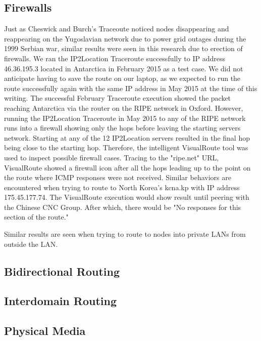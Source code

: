 \documentclass{sigcomm-alternate}
\begin{document}
\subsection{Firewalls}
Just as Cheswick and Burch's Traceoute \cite{ches} noticed nodes disappearing and reappearing on the Yugoslavian network due to power grid outages during the 1999 Serbian war, similar results were seen in this research due to erection of firewalls. We ran the IP2Location Traceroute successfully to IP address 46.36.195.3 located in Antarctica in February 2015 as a test case. We did not anticipate having to save the route on our laptop, as we expected to run the route successfully again with the same IP address in May 2015 at the time of this writing. The successful February Traceroute execution showed the packet reaching Antarctica via the router on the RIPE network in Oxford. However, running the IP2Location Traceroute in May 2015 to any of the RIPE network runs into a firewall showing only the hops before leaving the starting servers network. Starting at any of the 12 IP2Location servers resulted in the final hop being close to the starting hop. Therefore, the intelligent VisualRoute tool was used to inspect possible firewall cases. Tracing to the "ripe.net" URL, VisualRoute showed a firewall icon after all the hops leading up to the point on the route where ICMP responses were not received. Similar behaviors are encountered when trying to route to North Korea's kcna.kp with IP address 175.45.177.74. The VisualRoute execution would show result until peering with the Chinese CNC Group. After which, there would be "No responses for this section of the route."

Similar results are seen when trying to route to nodes into private LANs from outside the LAN. 

\subsection{Bidirectional Routing}

\subsection{Interdomain Routing}

\subsection{Physical Media}
\end{document}
